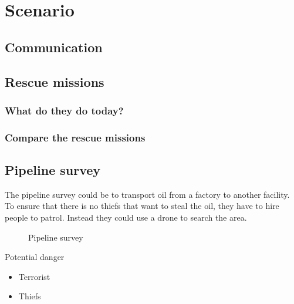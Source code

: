 \chapter{Scenario}\label{ch:scenario}

\section{Communication}
\section{Rescue missions}
\subsection{What do they do today?}
\subsection{Compare the rescue missions}

\section{Pipeline survey}
The pipeline survey could be to transport oil from a factory to another facility. To ensure that there is no thiefs that want to steal the oil, they have to hire people to patrol. Instead they could use a drone to search the area.
\begin{figure}[hb]
  \centering
  \caption[Pipeline survey]
   {Pipeline survey}
\end{figure}
Potential danger
\begin{itemize}
\item Terrorist
\item Thiefs
\end{itemize}